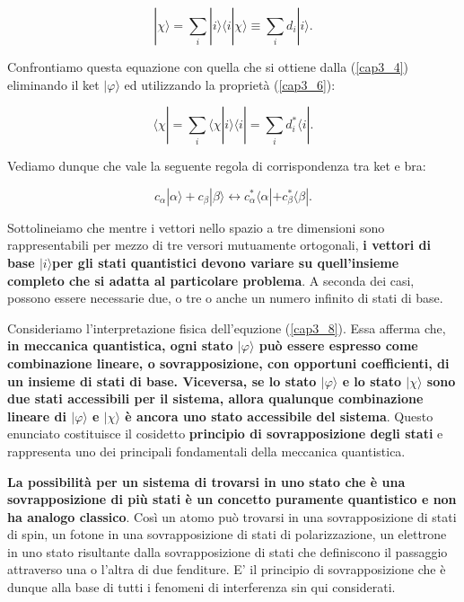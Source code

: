 \begin{equation}
| \chi \rangle = \sum \limits_{i} | i \rangle \langle i | \chi \rangle \equiv \sum \limits_{i} d_i | i \rangle .
\end{equation}

Confrontiamo questa equazione con quella che si ottiene dalla (\ref{cap3_4}) eliminando il ket $| \varphi \rangle$ ed utilizzando la proprietà (\ref{cap3_6}):

\begin{equation}
\langle \chi | =\sum \limits_{i} \langle \chi | i \rangle \langle i | = \sum \limits_{i} d^*_i \langle i | .
\end{equation}

Vediamo dunque che vale la seguente regola di corrispondenza tra ket e bra:

\begin{equation}
c_{\alpha}| \alpha \rangle +c_{\beta} | \beta \rangle  \leftrightarrow c^*_{\alpha}\langle \alpha | +c^*_{\beta}\langle \beta | .
\end{equation}

Sottolineiamo che mentre i vettori nello spazio a tre dimensioni sono rappresentabili per mezzo di tre versori mutuamente ortogonali, \textbf{i vettori di base $| i \rangle $per gli stati quantistici devono variare su quell'insieme completo che si adatta al particolare problema}. A seconda dei casi, possono essere necessarie due, o tre o anche un numero infinito di stati di base.

Consideriamo l'interpretazione fisica dell'equzione (\ref{cap3_8}). Essa afferma che, \textbf{in meccanica quantistica, ogni stato $| \varphi \rangle$ può essere espresso come combinazione lineare, o sovrapposizione, con opportuni coefficienti, di un insieme di stati di base. Viceversa, se lo stato $| \varphi \rangle$ e lo stato $| \chi \rangle$ sono due stati accessibili per il sistema, allora qualunque combinazione lineare di $| \varphi \rangle$ e $| \chi \rangle$ è ancora uno stato accessibile del sistema}. Questo enunciato costituisce il cosidetto \textbf{principio di sovrapposizione degli stati} e rappresenta uno dei principali fondamentali della meccanica quantistica.

\textbf{La possibilità per un sistema di trovarsi in uno stato che è una sovrapposizione di più stati è un concetto puramente quantistico e non ha analogo classico}. Così un atomo può trovarsi in una sovrapposizione di stati di spin, un fotone in una sovrapposizione di stati di polarizzazione, un elettrone in uno stato risultante dalla sovrapposizione di stati che definiscono il passaggio attraverso una o l'altra di due fenditure. E' il principio di sovrapposizione che è dunque alla base di tutti i fenomeni di interferenza sin qui considerati.

